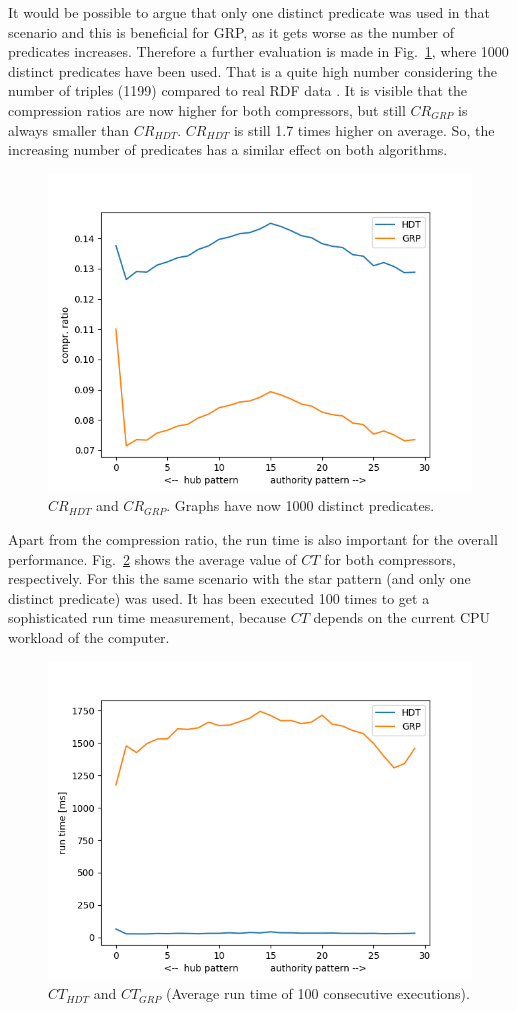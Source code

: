 It would be possible to argue that only one distinct predicate was used in that scenario and this is beneficial for GRP, as it gets worse as the number of predicates increases. Therefore a further evaluation is made in Fig.~\ref{fig:bothwithdict1000predicates}, where 1000 distinct predicates have been used. That is a quite high number considering the number of triples (1199) compared to real RDF data . It is visible that the compression ratios are now higher for both compressors, but still $CR_{GRP}$ is always smaller than $CR_{HDT}$. $CR_{HDT}$ is still 1.7 times higher on average. So, the increasing number of predicates has a similar effect on both algorithms.


\begin{figure}
	\centering
	\includegraphics[width=0.7\linewidth]{figures/GRPvsHDT/bothWithDict1000Predicates}
	\caption{$CR_{HDT}$ and $CR_{GRP}$. Graphs have now 1000 distinct predicates.}
	\label{fig:bothwithdict1000predicates}
\end{figure}

Apart from the compression ratio, the run time is also important for the overall performance. Fig.~\ref{fig:runtimes} shows the average value of $CT$ for both compressors, respectively. For this the same scenario with the star pattern (and only one distinct predicate) was used. It has been executed 100 times to get a sophisticated run time measurement, because $CT$ depends on the current CPU workload of the computer.

\begin{figure}
	\centering
	\includegraphics[width=0.7\linewidth]{figures/GRPvsHDT/runtimes}
	\caption{$CT_{HDT}$ and $CT_{GRP}$ (Average run time of 100 consecutive executions).}
	\label{fig:runtimes}
\end{figure}



